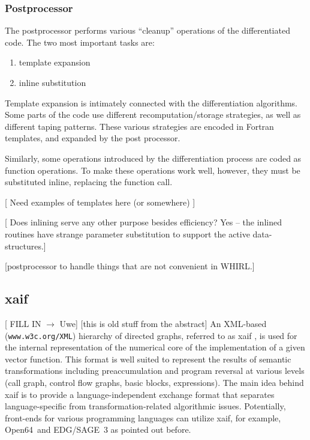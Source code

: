 \documentclass[acmtocl,acmnow]{acmtrans2m}
\newcommand{\OpenSixtyFour}{Open64}
\begin{document}
\subsubsection*{Postprocessor}
The postprocessor performs various ``cleanup'' operations of the
differentiated code. The two most important tasks are:
   \begin{enumerate}
      \item template expansion
      \item inline substitution
   \end{enumerate}

Template expansion is intimately connected with the differentiation
algorithms. Some parts of the code use different recomputation/storage
strategies, as well as different taping patterns. These various
strategies are encoded in Fortran templates, and expanded by the
post processor.

Similarly, some operations introduced by the differentiation process
are coded as function operations. To make these operations work well,
however, they must be substituted inline, replacing the function call.

{\color{Red}
[ Need examples of templates here (or somewhere) ]

[ Does inlining serve any other purpose besides efficiency?  Yes --
the inlined routines have strange parameter substitution to support
the active data-structures.]

[postprocessor to handle things that are not convenient in WHIRL.]
}

\subsection{xaif} \label{ssec:xaif}
{\color{Red} [ FILL IN $\to$ Uwe] } 
{\color{Blue} [this is old stuff from the abstract] 
An XML-based ({\tt www.w3c.org/XML}) hierarchy of directed graphs, referred to as xaif 
\cite{HNN02}, is used for the 
internal representation of the numerical core of the implementation
of a given vector function. This format is 
well suited to represent the results of  semantic transformations including 
preaccumulation \cite{BiHa96,CDB96,GrRe91} and 
program reversal \cite{Gri92,WaGr01} at various levels (call graph, control 
flow graphs, basic blocks, expressions). 
The main idea behind xaif is to provide a language-independent exchange
format that separates language-specific from transformation-related 
algorithmic issues. Potentially, front-ends for various programming languages 
can utilize xaif, for example, \OpenSixtyFour\ and EDG/SAGE~3 as pointed out before.
}
\end{document}
